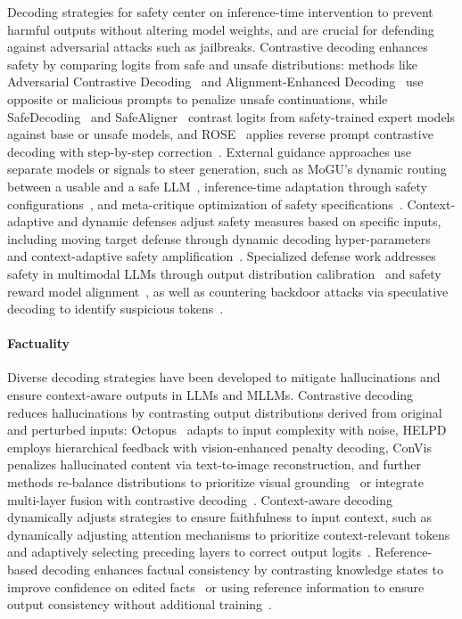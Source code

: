Decoding strategies for safety center on inference-time intervention to prevent harmful outputs without altering model weights, and are crucial for defending against adversarial attacks such as jailbreaks. Contrastive decoding enhances safety by comparing logits from safe and unsafe distributions: methods like Adversarial Contrastive Decoding~\citep{Zhao2024AdversarialCD} and Alignment-Enhanced Decoding~\citep{Liu2024AlignmentEnhancedDD} use opposite or malicious prompts to penalize unsafe continuations, while SafeDecoding~\citep{Xu2024SafeDecodingDA} and SafeAligner~\citep{Huang2024SafeAlignerSA} contrast logits from safety-trained expert models against base or unsafe models, and ROSE~\citep{Zhong2024ROSEDD} applies reverse prompt contrastive decoding with step-by-step correction~\citep{Zeng2024RootDS}. External guidance approaches use separate models or signals to steer generation, such as MoGU's dynamic routing between a usable and a safe LLM~\citep{Du2024MoGUAF}, inference-time adaptation through safety configurations~\citep{Zhang2024ControllableSA}, and meta-critique optimization of safety specifications~\citep{Gallego2025MetaSCTS}. Context-adaptive and dynamic defenses adjust safety measures based on specific inputs, including moving target defense through dynamic decoding hyper-parameters~\citep{Chen2024FlexLLMEL} and context-adaptive safety amplification~\citep{Banerjee2024SafeInferCA}. Specialized defense work addresses safety in multimodal LLMs through output distribution calibration~\citep{Gao2024CoCARS} and safety reward model alignment~\citep{Ghosal2024ImmuneIS}, as well as countering backdoor attacks via speculative decoding to identify suspicious tokens~\citep{Li2024CleanGenMB}.

\paragraph{Factuality}

Diverse decoding strategies have been developed to mitigate hallucinations and ensure context-aware outputs in LLMs and MLLMs. Contrastive decoding reduces hallucinations by contrasting output distributions derived from original and perturbed inputs: Octopus~\citep{Suo2025OctopusAH} adapts to input complexity with noise, HELPD~\citep{Yuan2024HELPDMH} employs hierarchical feedback with vision-enhanced penalty decoding, ConVis~\citep{Park2024ConVisCD} penalizes hallucinated content via text-to-image reconstruction, and further methods re-balance distributions to prioritize visual grounding~\citep{Liang2024MitigatingHI} or integrate multi-layer fusion with contrastive decoding~\citep{Chen2024LowerLM}. Context-aware decoding dynamically adjusts strategies to ensure faithfulness to input context, such as dynamically adjusting attention mechanisms to prioritize context-relevant tokens~\citep{Huang2025DynamicAC} and adaptively selecting preceding layers to correct output logits~\citep{Wang2024MLLMCS}. Reference-based decoding enhances factual consistency by contrasting knowledge states to improve confidence on edited facts~\citep{Bi2024DecodingBC} or using reference information to ensure output consistency without additional training~\citep{Shi2024ReferenceTD}.

